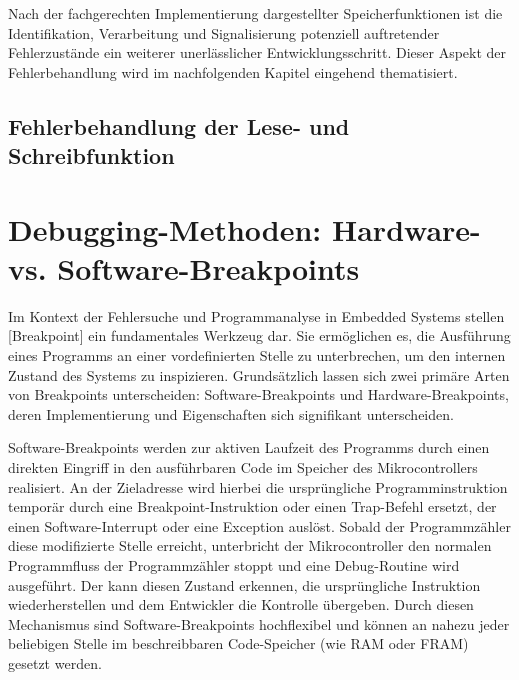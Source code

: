 Nach der fachgerechten Implementierung dargestellter Speicherfunktionen ist die Identifikation, Verarbeitung und Signalisierung potenziell auftretender Fehlerzust\"ande ein weiterer unerl\"asslicher Entwicklungsschritt. Dieser Aspekt der Fehlerbehandlung wird im nachfolgenden Kapitel eingehend thematisiert.\AI

\subsection{Fehlerbehandlung der Lese- und Schreibfunktion}
\label{Fehlerbehandlung_Lesen_Schreiben}



\newpage
\section{Debugging-Methoden: Hardware- vs. Software-Breakpoints}
\label{Hardware_VS_Software_Breakpoints}

Im Kontext der Fehlersuche und Programmanalyse in Embedded Systems stellen [Breakpoint] ein fundamentales Werkzeug dar. Sie erm\"oglichen es, die Ausf\"uhrung eines Programms an einer vordefinierten Stelle zu unterbrechen, um den internen Zustand des Systems zu inspizieren. Grunds\"atzlich lassen sich zwei prim\"are Arten von Breakpoints unterscheiden: Software-Breakpoints und Hardware-Breakpoints, deren Implementierung und Eigenschaften sich signifikant unterscheiden.

Software-Breakpoints werden zur aktiven Laufzeit des Programms durch einen direkten Eingriff in den ausf\"uhrbaren Code im Speicher des Mikrocontrollers realisiert. An der Zieladresse wird hierbei die urspr\"ungliche Programminstruktion tempor\"ar durch eine Breakpoint-Instruktion oder einen Trap-Befehl ersetzt, der einen Software-Interrupt oder eine Exception ausl\"ost. Sobald der Programmz\"ahler diese modifizierte Stelle erreicht, unterbricht der Mikrocontroller den normalen Programmfluss der Programmz\"ahler stoppt und eine Debug-Routine wird ausgef\"uhrt. Der  kann diesen Zustand erkennen, die urspr\"ungliche Instruktion wiederherstellen und dem Entwickler die Kontrolle \"ubergeben. Durch diesen Mechanismus sind Software-Breakpoints hochflexibel und k\"onnen an nahezu jeder beliebigen Stelle im beschreibbaren Code-Speicher (wie RAM oder FRAM) gesetzt werden.

